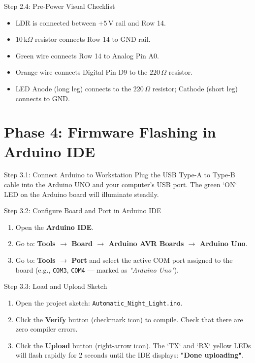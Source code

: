 \documentclass[12pt,a4paper]{article}
\begin{document}
\begin{stepbox}{Step 2.4: Pre-Power Visual Checklist}
\begin{itemize}
    \item[$\square$] LDR is connected between $+5\,\text{V}$ rail and Row 14.
    \item[$\square$] $10\,\text{k}\Omega$ resistor connects Row 14 to GND rail.
    \item[$\square$] Green wire connects Row 14 to Analog Pin A0.
    \item[$\square$] Orange wire connects Digital Pin D9 to the $220\,\Omega$ resistor.
    \item[$\square$] LED Anode (long leg) connects to the $220\,\Omega$ resistor; Cathode (short leg) connects to GND.
\end{itemize}
\end{stepbox}

\newpage

\section*{Phase 4: Firmware Flashing in Arduino IDE}

\begin{stepbox}{Step 3.1: Connect Arduino to Workstation}
Plug the USB Type-A to Type-B cable into the Arduino UNO and your computer's USB port. The green `ON` LED on the Arduino board will illuminate steadily.
\end{stepbox}

\begin{stepbox}{Step 3.2: Configure Board and Port in Arduino IDE}
\begin{enumerate}
    \item Open the \textbf{Arduino IDE}.
    \item Go to: \textbf{Tools $\to$ Board $\to$ Arduino AVR Boards $\to$ Arduino Uno}.
    \item Go to: \textbf{Tools $\to$ Port} and select the active COM port assigned to the board (e.g., \texttt{COM3}, \texttt{COM4} --- marked as \emph{"Arduino Uno"}).
\end{enumerate}
\end{stepbox}

\begin{stepbox}{Step 3.3: Load and Upload Sketch}
\begin{enumerate}
    \item Open the project sketch: \texttt{Automatic\_Night\_Light.ino}.
    \item Click the \textbf{Verify} button (checkmark icon) to compile. Check that there are zero compiler errors.
    \item Click the \textbf{Upload} button (right-arrow icon). The `TX` and `RX` yellow LEDs will flash rapidly for 2 seconds until the IDE displays: \textbf{"Done uploading"}.
\end{enumerate}
\end{stepbox}
\end{document}
